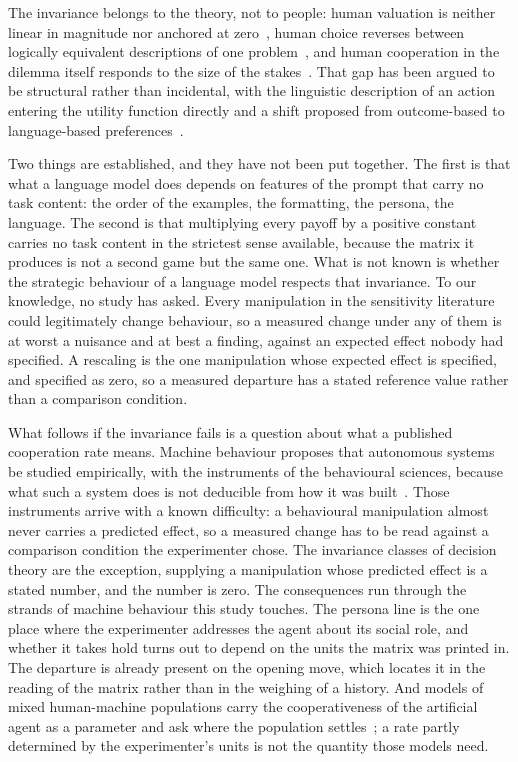 \documentclass[openacc]{rsproca_new}
\begin{document}
The invariance belongs to the theory, not to people: human valuation is neither
linear in magnitude nor anchored at zero~\cite{kahneman1979prospect}, human
choice reverses between logically equivalent descriptions of one
problem~\cite{tversky1981framing}, and human cooperation in the dilemma itself
responds to the size of the stakes~\cite{krockow2016cooperation,list2006friend}.
That gap has been argued to be structural rather than incidental, with the
linguistic description of an action entering the utility function directly and
a shift proposed from outcome-based to language-based
preferences~\cite{capraro2024language}.

Two things are established, and they have not been put together. The first is
that what a language model does depends on features of the prompt that carry no
task content: the order of the examples, the formatting, the persona, the
language. The second is that multiplying every payoff by a positive constant
carries no task content in the strictest sense available, because the matrix it
produces is not a second game but the same one. What is not known is whether
the strategic behaviour of a language model respects that invariance. To our
knowledge, no study has asked. Every manipulation in the sensitivity literature
could legitimately change behaviour, so a measured change under any of them is
at worst a nuisance and at best a finding, against an expected effect nobody
had specified. A rescaling is the one manipulation whose expected effect is
specified, and specified as zero, so a measured departure has a stated
reference value rather than a comparison condition.

What follows if the invariance fails is a question about what a published
cooperation rate means. Machine behaviour proposes that autonomous systems be
studied empirically, with the instruments of the behavioural sciences, because
what such a system does is not deducible from how it was
built~\cite{rahwan2019machine}. Those instruments arrive with a known
difficulty: a behavioural manipulation almost never carries a predicted effect,
so a measured change has to be read against a comparison condition the
experimenter chose. The invariance classes of decision theory are the
exception, supplying a manipulation whose predicted effect is a stated number,
and the number is zero. The consequences run through the strands of machine
behaviour this study touches. The persona line is the one place where the
experimenter addresses the agent about its social role, and whether it takes
hold turns out to depend on the units the matrix was printed in. The departure
is already present on the opening move, which locates it in the reading of the
matrix rather than in the weighing of a history. And models of mixed
human-machine populations carry the cooperativeness of the artificial agent as
a parameter and ask where the population
settles~\cite{santos2018social,han2011intention,han2013good,perc2017statistical,paiva2018engineering};
a rate partly determined by the experimenter's units is not the quantity those
models need.
\end{document}
